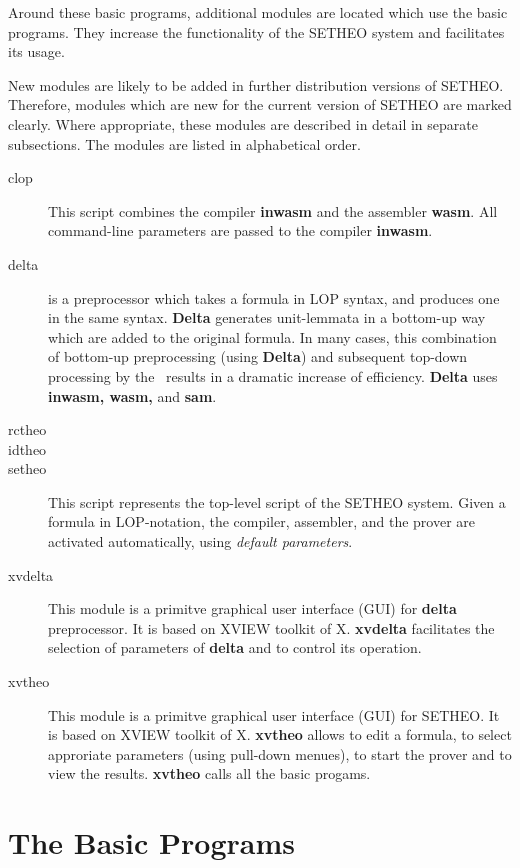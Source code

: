 Around these basic programs, additional modules are located which
use the basic programs. They increase the functionality of the
SETHEO system and facilitates its usage.

New modules are likely to be added in further distribution versions
of SETHEO. Therefore, modules which are new for the current version of
SETHEO are marked clearly.
Where appropriate, these modules are described in detail in separate
subsections.
The modules are listed in alphabetical order.

\begin{description}
\item[clop]
This script combines the compiler {\bf inwasm} and the assembler
{\bf wasm}. All command-line parameters are passed to the compiler
{\bf inwasm}.
\item[delta]
is a preprocessor which takes a formula in LOP syntax, and produces
one in the same syntax. {\bf Delta} generates unit-lemmata in a bottom-up
way which are added to the original formula. In many cases, this combination
of bottom-up preprocessing (using {\bf Delta}) and subsequent top-down
processing by the \SAM\ results in a dramatic increase of efficiency.
{\bf Delta} uses {\bf inwasm, wasm,} and {\bf sam}.
\item[rctheo]
\item[idtheo]
\item[setheo]
This script represents the top-level script of the SETHEO system.
Given a formula in LOP-notation, the compiler, assembler, and the
prover are activated automatically, using {\em default parameters}.
\item[xvdelta]
This module is a primitve graphical user interface (GUI) for {\bf delta}
preprocessor.
It is based on XVIEW toolkit of X. {\bf xvdelta} facilitates the selection
of parameters of {\bf delta} and to control its operation.
\item[xvtheo]
This module is a primitve graphical user interface (GUI) for SETHEO.
It is based on XVIEW toolkit of X. {\bf xvtheo} allows to edit
a formula, to select approriate parameters (using pull-down menues),
to start the prover and to view the results.
{\bf xvtheo} calls all the basic progams.
\end{description}




\chapter{The Basic Programs}

